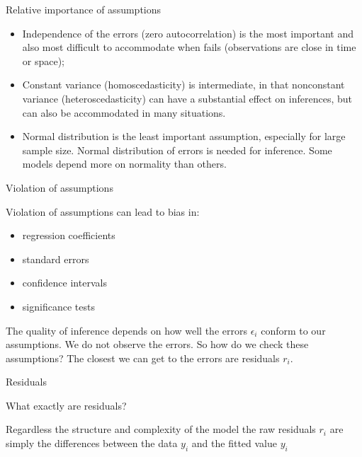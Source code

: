 \documentclass{beamer}
\begin{document}
\begin{frame}{Relative importance of assumptions}
\begin{itemize}
	\item Independence of the errors (zero autocorrelation) is the most important and also most difficult to accommodate when fails (observations are close in time or space);
	\pause
\item Constant variance (homoscedasticity) is intermediate, in that nonconstant variance (heteroscedasticity) can have a substantial effect on inferences, but can also be accommodated in many situations.
	\pause
\item Normal distribution is the least important assumption, especially for large sample size.
Normal distribution of errors is needed for inference. Some models depend more on normality than others.

\end{itemize}
\end{frame}



\begin{frame}{Violation of assumptions}

Violation of assumptions can lead to bias in:

\begin{itemize}
	\item regression coefficients
	\item standard errors
	\item confidence intervals
	\item significance tests  
\end{itemize}
	\vspace{1cm}
\pause The quality of inference depends on how well the errors $\epsilon_{i}$ conform to our assumptions.
\pause  We do not observe the errors. So how do we check these assumptions?
\pause The closest we can get to the errors are residuals $r_{i}$.
\end{frame}

\begin{frame}{Residuals}

What exactly are residuals?
\pause
\vspace{1cm}

Regardless the structure and complexity of the model the raw residuals $r_{i}$ are simply the differences between the data $y_{i}$ and the fitted value $y_{i}$ 

\end{frame}
\end{document}
